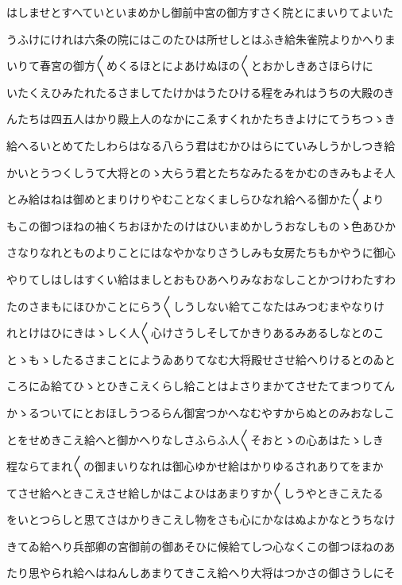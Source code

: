 \documentclass[a4paper,11pt,landscape]{ltjtarticle}
\begin{document}
はしませとすへていといまめかし御前中宮の御方すさく院とにまいりてよいた
\par\medskip
うふけにけれは六条の院にはこのたひは所せしとはふき給朱雀院よりかへりま
\par\medskip
いりて春宮の御方〱めくるほとによあけぬほの〱とおかしきあさほらけに
\par\medskip
いたくえひみたれたるさましてたけかはうたひける程をみれはうちの大殿のき
\par\medskip
んたちは四五人はかり殿上人のなかにこゑすくれかたちきよけにてうちつゝき
\par\medskip
給へるいとめてたしわらはなる八らう君はむかひはらにていみしうかしつき給
\par\medskip
かいとうつくしうて大将とのゝ大らう君とたちなみたるをかむのきみもよそ人
\par\medskip
とみ給はねは御めとまりけりやむことなくましらひなれ給へる御かた〱より
\par\medskip
もこの御つほねの袖くちおほかたのけはひいまめかしうおなしものゝ色あひか
\par\medskip
さなりなれとものよりことにはなやかなりさうしみも女房たちもかやうに御心
\par\medskip
やりてしはしはすくい給はましとおもひあへりみなおなしことかつけわたすわ
\par\medskip
たのさまもにほひかことにらう〱しうしない給てこなたはみつむまやなりけ
\par\medskip
れとけはひにきはゝしく人〱心けさうしそしてかきりあるみあるしなとのこ
\par\medskip
とゝもゝしたるさまことにようゐありてなむ大将殿せさせ給へりけるとのゐと
\par\medskip
ころにゐ給てひゝとひきこえくらし給ことはよさりまかてさせたてまつりてん
\par\medskip
かゝるついてにとおほしうつるらん御宮つかへなむやすからぬとのみおなしこ
\par\medskip
とをせめきこえ給へと御かへりなしさふらふ人〱そおとゝの心あはたゝしき
\par\medskip
程ならてまれ〱の御まいりなれは御心ゆかせ給はかりゆるされありてをまか
\par\medskip
てさせ給へときこえさせ給しかはこよひはあまりすか〱しうやときこえたる
\par\medskip
をいとつらしと思てさはかりきこえし物をさも心にかなはぬよかなとうちなけ
\par\medskip
きてゐ給へり兵部卿の宮御前の御あそひに候給てしつ心なくこの御つほねのあ
\par\medskip
たり思やられ給へはねんしあまりてきこえ給へり大将はつかさの御さうしにそ
\end{document}
